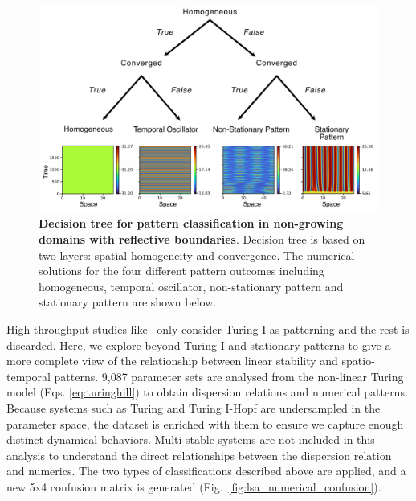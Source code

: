 \begin{figure}[H] %
    \centering
    \begin{adjustbox}{center}
    \includegraphics[width=1\textwidth]{chapters/Chapter 1/no growth classification} %
    \end{adjustbox}
    \caption{\textbf{Decision tree for pattern classification in non-growing domains with reflective boundaries}. Decision tree is based on two layers: spatial homogeneity and convergence. The numerical solutions for the four different pattern outcomes including homogeneous, temporal oscillator, non-stationary pattern and stationary pattern are shown below.}
    \label{fig:no growth classification} %
\end{figure}


High-throughput studies like~\cite{Scholes2019, Zheng2016, Marcon} only consider Turing I as patterning and the rest is discarded.
Here, we explore beyond Turing I and stationary patterns to give a more complete view of the relationship between linear stability and spatio-temporal patterns.
9,087 parameter sets are analysed from the non-linear Turing model (Eqs. \ref{eq:turinghill}) to obtain dispersion relations and numerical patterns.
Because systems such as Turing and Turing I-Hopf are undersampled in the parameter space, the dataset is enriched with them to ensure we capture enough distinct dynamical behaviors.
Multi-stable systems are not included in this analysis to understand the direct relationships between the dispersion relation and numerics.
The two types of classifications described above are applied, and a new 5x4 confusion matrix is generated (Fig.~\ref{fig:lsa_numerical_confusion}).

